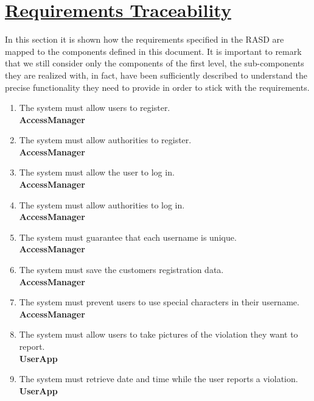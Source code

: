 \section[Requirements Traceability]{\hyperlink{toc}{Requirements Traceability}}
	\label{sec:requirementsTraceability}
	
	In this section it is shown how the requirements specified in the RASD are mapped
	to the components defined in this document. It is important to remark that we still consider only the components of the first level, the sub-components they are realized with, in fact, have been sufficiently described to understand the precise functionality they need to provide in order to stick with the requirements.
	
	\begin{enumerate}[label=\textbf{R\arabic*}]
		\item \label{req:userReg} The system must allow users to register.\\
		\textbf{AccessManager}
		\item \label{req:authorityReg} The system must allow authorities to register.\\
		\textbf{AccessManager}
		\item \label{req:userLogin} The system must allow the user to log in.\\
		\textbf{AccessManager}
		\item \label{req:authorityLogin} The system must allow authorities to log in.\\
		\textbf{AccessManager}
		\item \label{req:uniqueName} The system must guarantee that each username is unique.\\
		\textbf{AccessManager}
		\item \label{req:saveRegData} The system must save the customers registration data.\\
		\textbf{AccessManager}
		\item \label{req:specialCharacters} The system must prevent users to use special characters in their username.\\
		\textbf{AccessManager}
		\item \label{req:takePictures} The system must allow users to take pictures of the violation they want to report.\\
		\textbf{UserApp}
		\item \label{req:dateTime} The system must retrieve date and time while the user reports a violation.\\
		\textbf{UserApp}

\end{enumerate}
